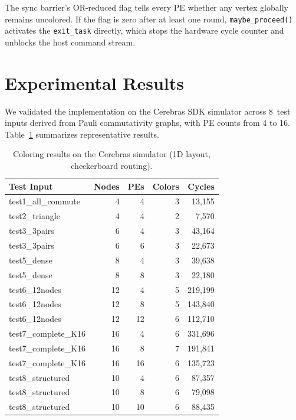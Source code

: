 \documentclass[11pt,letterpaper]{article}
\begin{document}
The sync barrier's OR-reduced flag tells every PE whether any vertex globally remains uncolored. If the flag is zero after at least one round, \texttt{maybe\_proceed()} activates the \texttt{exit\_task} directly, which stops the hardware cycle counter and unblocks the host command stream.

\section{Experimental Results}
\label{sec:results}

We validated the implementation on the Cerebras SDK simulator across 8~test inputs derived from Pauli commutativity graphs, with PE counts from 4 to 16. Table~\ref{tab:results} summarizes representative results.

\begin{table}[h]
\centering
\caption{Coloring results on the Cerebras simulator (1D layout, checkerboard routing).}
\label{tab:results}
\renewcommand{\arraystretch}{1.15}
\begin{tabular}{lrrrr}
\toprule
\textbf{Test Input} & \textbf{Nodes} & \textbf{PEs} & \textbf{Colors} & \textbf{Cycles} \\
\midrule
test1\_all\_commute  & 4  & 4  & 3 & 13{,}155 \\
test2\_triangle      & 4  & 4  & 2 & 7{,}570 \\
test3\_3pairs        & 6  & 4  & 3 & 43{,}164 \\
test3\_3pairs        & 6  & 6  & 3 & 22{,}673 \\
test5\_dense         & 8  & 4  & 3 & 39{,}638 \\
test5\_dense         & 8  & 8  & 3 & 22{,}180 \\
test6\_12nodes       & 12 & 4  & 5 & 219{,}199 \\
test6\_12nodes       & 12 & 8  & 5 & 143{,}840 \\
test6\_12nodes       & 12 & 12 & 6 & 112{,}710 \\
test7\_complete\_K16 & 16 & 4  & 6 & 331{,}696 \\
test7\_complete\_K16 & 16 & 8  & 7 & 191{,}841 \\
test7\_complete\_K16 & 16 & 16 & 6 & 135{,}723 \\
test8\_structured    & 10 & 4  & 6 & 87{,}357 \\
test8\_structured    & 10 & 8  & 6 & 79{,}098 \\
test8\_structured    & 10 & 10 & 6 & 88{,}435 \\
\bottomrule
\end{tabular}
\end{table}
\end{document}
